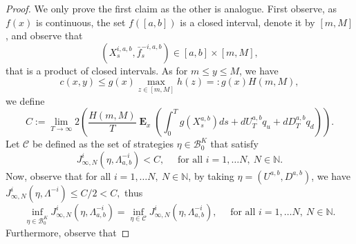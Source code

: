 \documentclass[10pt,a4paper]{amsart}
\newcommand\E{\operatorname{\mathbf{E}}}
\begin{document}
\begin{proof}
    We only prove the first claim as the other is analogue.
    First observe, as $f(x)$ is continuous, the set $f([a,b])$ is a closed interval, denote it by $[m,M]$,
and  observe that 
$$
(X^{i,a,b}_s,\bar f^{-i,a,b}_s)\in [a,b]\times[m,M], 
$$
that is a product of closed intervals. 
As for $m \leq y \leq M$, we have   
%
\begin{equation}\label{eq:cbounded}
    c(x,y) \leq g(x)\max_{z \in [m,M]}h(z)  =: g(x)H(m,M)  ,
\end{equation}
we define
 $$C:= \lim_{T \to \infty} 2 \left( \frac{H(m,M)}{T}\E_x \left( \int_0^T g ( X^{a,b}_s ) ds +dU_T^{a,b}q_u+dD_T^{a,b}q_d \right) \right) . $$
%
  Let $\mathcal{C}$ be defined as the set of strategies $\eta \in \mathcal{B}^K_0$ that satisfy 
  $$J_{\infty,N}^i (\eta, \Lambda^{-i}_{a,b})<C , \quad \text{ for all } i=1, \dots N, \ N \in \mathbb{N}. $$
 Now, observe that for all $i=1, \dots N, \ N \in \mathbb{N}$, by taking $\eta = (U^{a,b},D^{a,b})$, we have  $ J_{\infty,N}^i (\eta,\Lambda^{-i})\leq C/2< C ,$ thus
\begin{equation*}
    \inf_{\eta \in \mathcal{B}^K_0} J_{\infty,N}^i (\eta,\Lambda^{-i}_{a,b})=   \inf_{\eta \in \mathcal{C}} J_{\infty,N}^i (\eta,\Lambda^{-i}_{a,b}), \quad \text{ for all } i=1, \dots N, \ N \in \mathbb{N}.  
\end{equation*}
Furthermore, observe that


\end{proof}
\end{document}
